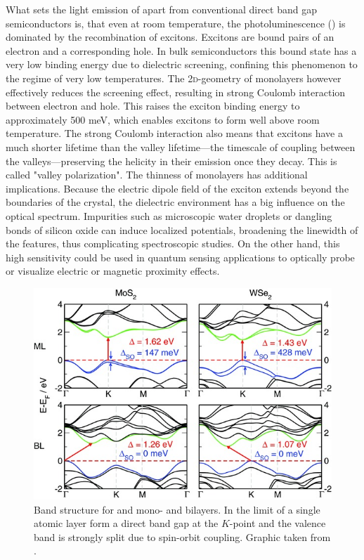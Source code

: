 What sets the light emission of \tmds apart from conventional direct band gap semiconductors is, that even at room temperature, the photoluminescence (\pl\!) is dominated by the recombination of excitons. Excitons are bound pairs of an electron and a corresponding hole. In bulk semiconductors this bound state has a very low binding energy due to dielectric screening, confining this phenomenon to the regime of very low temperatures. The 2\textsc{d}-geometry of \tmdg monolayers however effectively reduces the screening effect, resulting in strong Coulomb interaction between electron and hole. This raises the exciton binding energy to approximately 500 meV, which enables excitons to form well above room temperature\cite{chernikov_exciton_2014}.
The strong Coulomb interaction also means that excitons have a much shorter lifetime than the valley lifetime---the timescale of coupling between the valleys---preserving the helicity in their emission once they decay. This is called "valley polarization".
The thinness of \tmdg monolayers has additional implications. Because the electric dipole field of the exciton extends beyond the boundaries of the crystal, the dielectric environment has a big influence on the optical spectrum\cite{stier_probing_2016, borghardt_engineering_2017, jakubczyk_impact_2018}. Impurities such as microscopic water droplets or dangling bonds of silicon oxide can induce localized potentials, broadening the linewidth of the \pl features, thus complicating spectroscopic studies. On the other hand, this high sensitivity could be used in quantum sensing applications to optically probe or visualize electric or magnetic proximity effects\cite{peng_valley_2017, zhao_enhanced_2017, smolenski_tuning_2016, neumann_opto-valleytronic_2017}.


\begin{figure}[t]
\centering
\includegraphics[width=.7\textwidth]{bandstructure}
\caption{Band structure for \mos and \wse mono- and bilayers. In the limit of a single atomic layer \tmds form a direct band gap at the $K$-point and the valence band is strongly split due to spin-orbit coupling. Graphic taken from \cite{zibouche_transition-metal_2014_2}.}
\label{bandgap}

\end{figure}

